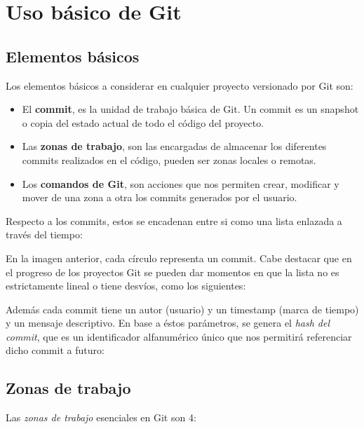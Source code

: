 \documentclass{article}
\begin{document}
\section{Uso básico de Git}\label{basic}

\subsection{Elementos básicos}

Los elementos básicos a considerar en cualquier proyecto versionado por Git son:

\begin{itemize}
\item El \textbf{commit}, es la unidad de trabajo básica de Git. Un commit es un snapshot o copia del estado actual de todo el código del proyecto.
\item Las \textbf{zonas de trabajo}, son las encargadas de almacenar los diferentes commits realizados en el código, pueden ser zonas locales o remotas.
\item Los \textbf{comandos de Git}, son acciones que nos permiten crear, modificar y mover de una zona a otra los commits generados por el usuario.
\end{itemize}

Respecto a los commits, estos se encadenan entre si como una lista enlazada a través del tiempo\cite{hades}:

En la imagen anterior, cada círculo representa un commit. Cabe destacar que en el progreso de los proyectos Git se pueden dar momentos en que la lista no es estrictamente lineal o tiene desvíos, como los siguientes:

Además cada commit tiene un autor (usuario) y un timestamp (marca de tiempo) y un mensaje descriptivo. En base a éstos parámetros, se genera el \textit{hash del commit}, que es un identificador alfanumérico único que nos permitirá referenciar dicho commit a futuro:

\subsection{Zonas de trabajo}

Las \textit{zonas de trabajo} esenciales en Git son 4:
\end{document}
